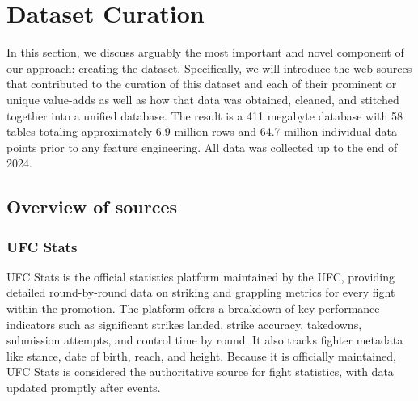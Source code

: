 \documentclass[12pt,twoside]{report}
\begin{document}
\section{Dataset Curation}

In this section, we discuss arguably the most important and novel component of our approach: creating the dataset. Specifically, we will introduce the web sources that contributed to the curation of this dataset and each of their prominent or unique value-adds as well as how that data was obtained, cleaned, and stitched together into a unified database. The result is a 411 megabyte database with 58 tables totaling approximately 6.9 million rows and 64.7 million individual data points prior to any feature engineering. All data was collected up to the end of 2024.


\subsection{Overview of sources}
\subsubsection{UFC Stats}

UFC Stats is the official statistics platform maintained by the UFC, providing detailed round-by-round data on striking and grappling metrics for every fight within the promotion. The platform offers a breakdown of key performance indicators such as significant strikes landed, strike accuracy, takedowns, submission attempts, and control time by round. It also tracks fighter metadata like stance, date of birth, reach, and height. Because it is officially maintained, UFC Stats is considered the authoritative source for fight statistics, with data updated promptly after events.
\end{document}
